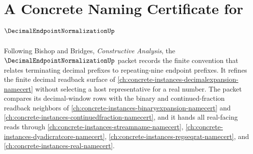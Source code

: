 \chapter{A Concrete Naming Certificate for $\DecimalEndpointNormalizationUp$}
\label{ch:concrete-instances-decimal-endpoint-normalization-namecert}

Following Bishop and Bridges, \emph{Constructive Analysis}, the $\DecimalEndpointNormalizationUp$ packet records the finite convention that relates terminating decimal prefixes to repeating-nine endpoint prefixes. It refines the finite decimal readback surface of \autoref{ch:concrete-instances-decimalexpansion-namecert} without selecting a host representative for a real number. The packet compares its decimal-window rows with the binary and continued-fraction readback neighbors of \autoref{ch:concrete-instances-binaryexpansion-namecert} and \autoref{ch:concrete-instances-continuedfraction-namecert}, and it hands all real-facing reads through \autoref{ch:concrete-instances-streamname-namecert}, \autoref{ch:concrete-instances-dyadicratcore-namecert}, \autoref{ch:concrete-instances-regseqrat-namecert}, and \autoref{ch:concrete-instances-real-namecert}.


